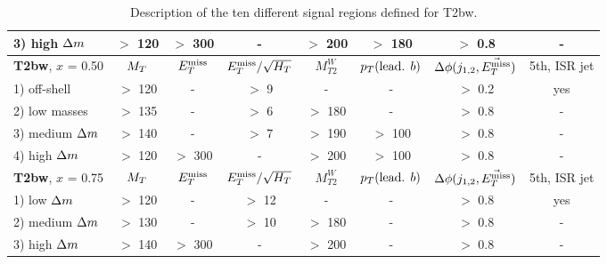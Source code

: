 \begin{table}[!ht]
{\begin{center}
\begin{tabular}{|l|ccccccc|}
                    3) high   $\Delta m$ & $>$ 120   & $>$ 300  &     -           &  $>$ 200   & $>$ 180               &  $>$ 0.8      & -             \\
                    \hline
                      \textbf{T2bw}, $x$ = 0.50       & $M_T$     & $E_T^\text{miss}$    & $E_T^\text{miss}/\sqrt{H_T}$ & $M_{T2}^W$ & $p_T(\text{lead. }b)$ & $\Delta\phi(j_{1,2},\vec{E_T^\text{miss}})$ & 5th, ISR jet  \\
                        \hline
                    1) off-shell       &  $>$ 120  &   -      &  $>$  9         &    -       & -                     &  $>$ 0.2      & yes           \\
                    2) low masses      &  $>$ 135  &   -      &  $>$  6         & $>$ 180    & -                     &  $>$ 0.8      & -             \\
                    3) medium $\Delta m$ &  $>$ 140  &   -      &  $>$  7         & $>$ 190    & $>$ 100               &  $>$ 0.8      & -             \\
                    4) high   $\Delta m$ &  $>$ 120  & $>$ 300  &   -             & $>$ 200    & $>$ 100               &  $>$ 0.8      & -             \\
                        \hline
                        \textbf{T2bw}, $x$ = 0.75     & $M_T$     & $E_T^\text{miss}$    & $E_T^\text{miss}/\sqrt{H_T}$ & $M_{T2}^W$ & $p_T(\text{lead. }b)$ & $\Delta\phi(j_{1,2},\vec{E_T^\text{miss}})$ & 5th, ISR jet  \\
                        \hline
                    1) low    $\Delta m$ &  $>$ 120  &   -      &  $>$  12        &     -      &      -                &  $>$ 0.8      & yes           \\
                    2) medium $\Delta m$ &  $>$ 130  &   -      &  $>$  10        &  $>$ 180   &      -                &  $>$ 0.8      & -             \\
                    3) high   $\Delta m$ &  $>$ 140  & $>$ 300  &    -            &  $>$ 200   &      -                &  $>$ 0.8      & -             \\
                        \hline                                                 
                    \end{tabular}
            \caption{Description of the ten different signal regions defined for T2bw. \label{tab:cutAndCountCuts}} 
            \end{center}}
            \end{table}


